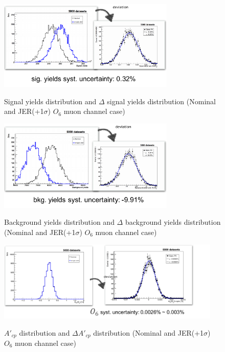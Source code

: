 		\begin{figure}[H]
		\centering
		    \includegraphics[width=0.75\textwidth]{Figures/SystUnc/sig_yields_unc.pdf}\\
		\caption{Signal yields distribution and $\Delta$ signal yields distribution (Nominal and JER(+1$\sigma$) $O_6$ muon channel case) }
		\label{Syst:fig:deviation_sig}
		\end{figure}
		\FloatBarrier

		\begin{figure}[H]
		\centering
		    \includegraphics[width=0.75\textwidth]{Figures/SystUnc/bkg_yields_unc.pdf}\\
		\caption{Background yields distribution and $\Delta$ background yields distribution (Nominal and JER(+1$\sigma$) $O_6$ muon channel case) }
		\label{Syst:fig:deviation_bkg}
		\end{figure}
		\FloatBarrier

		\begin{figure}[H]
		\centering
		    \includegraphics[width=0.95\textwidth]{Figures/SystUnc/Acp_unc.png}\\
		\caption{$A'_{cp}$ distribution and $\Delta A'_{cp}$ distribution (Nominal and JER(+1$\sigma$) $O_6$ muon channel case) }
		\label{Syst:fig:deviation_Acp}
		\end{figure}
		\FloatBarrier

